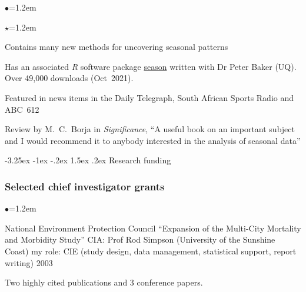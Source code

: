 \documentclass[a4paper,11pt]{article}
\makeatletter
\renewcommand\subsection{\@startsection{subsection}{2}{\z@}%
                                       {-3.25ex \@plus -1ex \@minus -.2ex}%
                                       {1.5ex \@plus .2ex}%
                                   {\normalfont\normalsize\bfseries\color{blue}}}
\renewcommand{\labelitemi}{$\bullet$}
\renewcommand{\labelitemii}{$\star$}
\makeatother
\begin{document}
\begin{raggedright}
\begin{list}{\labelitemi}{\leftmargin=1.2em}
\begin{list}{\labelitemii}{\leftmargin=1.2em}
\item Contains many new methods for uncovering seasonal patterns
\item Has an associated \textit{R} software package \href{http://cran.r-project.org/web/packages/season/index.html}{season} written with Dr Peter Baker (UQ). Over 49,000 downloads (Oct~2021).
\item Featured in news items in the Daily Telegraph, South African Sports Radio and ABC~612
\item Review by M.\ C.\ Borja in \textit{Significance}, ``A useful book on an important subject and I would recommend it to anybody interested in the analysis of seasonal data''
\end{list}
\end{list}

\subsection{Research funding}

\subsubsection*{Selected chief investigator grants} 

\begin{list}{\labelitemi}{\leftmargin=1.2em}\addtolength{\itemsep}{-0.5\baselineskip}

\item National Environment Protection Council ``Expansion of the Multi-City Mortality and Morbidity Study'' CIA: Prof Rod Simpson (University of the Sunshine Coast) my role: CIE (study design, data management, statistical support, report writing) 2003

    Two highly cited publications  and 3 conference papers.%



\end{list}
\end{raggedright}
\end{document}
